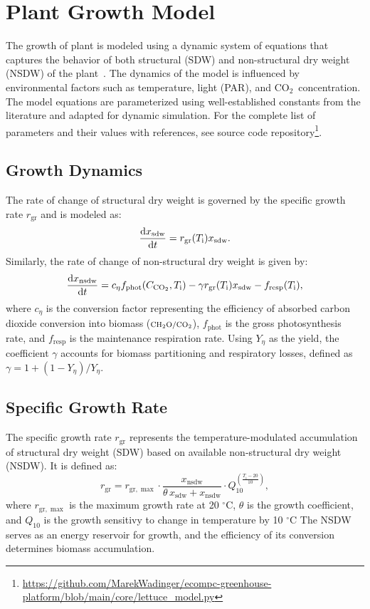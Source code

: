 \documentclass[conference]{IEEEtran}
\newcommand{\ui}[2]{#1_{\mathrm{#2}}}
\newcommand{\coo}{\ensuremath{\mathrm{CO_2}}}
\newcommand{\chho}{\ensuremath{\mathrm{CH_2O}}}
\begin{document}
\section{Plant Growth Model}\label{sec:lettuce_growth}
The growth of plant is modeled using a dynamic system of equations that captures the behavior of both structural (SDW) and non-structural dry weight (NSDW) of the plant~\cite{VANHENTEN199455}. The dynamics of the model is influenced by environmental factors such as temperature, light (PAR), and \coo\ concentration. The model equations are parameterized using well-established constants from the literature and adapted for dynamic simulation. For the complete list of parameters and their values with references, see source code repository\footnote{\url{https://github.com/MarekWadinger/ecompc-greenhouse-platform/blob/main/core/lettuce_model.py}}.

\subsection{Growth Dynamics} The rate of change of structural dry weight is governed by the specific growth rate \( \ui{r}{gr} \) and is modeled as:
\begin{equation}
    \diff{\ui{x}{sdw}}{t} = \ui{r}{gr}(\ui{T}{i}) \ui{x}{sdw}.
\end{equation}
Similarly, the rate of change of non-structural dry weight is given by:
\begin{equation}
    \diff{\ui{x}{nsdw}}{t} = c_{\eta} \ui{f}{phot}(\ui{C}{\coo}, \ui{T}{i}) - \gamma \ui{r}{gr}(\ui{T}{i}) \ui{x}{sdw} - \ui{f}{resp}(\ui{T}{i}),
\end{equation}
where \( c_{\eta} \) is the conversion factor representing the efficiency of absorbed carbon dioxide conversion into biomass (\(\mathsmaller{\chho/\coo}\)), \( \ui{f}{phot} \) is the gross photosynthesis rate, and \( \ui{f}{resp} \) is the maintenance respiration rate. Using \( Y_{\eta} \) as the yield, the coefficient \( \gamma \) accounts for biomass partitioning and respiratory losses, defined as \( \gamma = 1 + (1 - Y_{\eta}) / Y_{\eta} \).

\subsection{Specific Growth Rate} The specific growth rate \( \ui{r}{gr} \) represents the temperature-modulated accumulation of structural dry weight (SDW) based on available non-structural dry weight (NSDW). It is defined as:
\begin{equation}
    \ui{r}{gr} = \ui{r}{gr,\max} \cdot \frac{\ui{x}{nsdw}}{\theta \, \ui{x}{sdw} + \ui{x}{nsdw}} \cdot Q_{10}^{\left( \frac{\ui{T}{i} - 20}{10} \right)},
\end{equation}
where \( \ui{r}{gr,\max} \) is the maximum growth rate at 20 \( ^\circ \)C, \( \theta \) is the growth coefficient, and \( Q_{10} \) is the growth sensitivy to change in temperature by 10 \( ^\circ \)C The NSDW serves as an energy reservoir for growth, and the efficiency of its conversion determines biomass accumulation.
\end{document}
